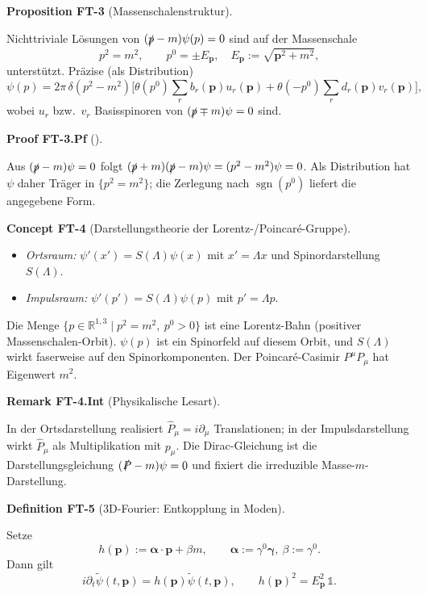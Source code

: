 \documentclass[10pt, letterpaper]{article}
\newcommand{\sgn}{\operatorname{sgn}}
\newcommand{\R}{\mathbb{R}}
\newcommand{\CustomHeading}[3]{%
  \par\medskip\noindent%
  \textbf{#1 #2} \textnormal{(#3)}.\enskip%
}
\newenvironment{DEF}[2]{\begin{unitbox}\CustomHeading{Definition}{#1}{#2}}{\end{unitbox}}
\newenvironment{PROP}[2]{\begin{unitbox}\CustomHeading{Proposition}{#1}{#2}}{\end{unitbox}}
\newenvironment{REM}[2]{\begin{unitbox}\CustomHeading{Remark}{#1}{#2}}{\end{unitbox}}
\newenvironment{CONC}[2]{\begin{unitbox}\CustomHeading{Concept}{#1}{#2}}{\end{unitbox}}
\newenvironment{PROOF}[2]{\begin{unitbox}\CustomHeading{Proof}{#1}{#2}}{\end{unitbox}}
\begin{document}
\begin{PROP}{FT-3}{Massenschalenstruktur}
Nichttriviale Lösungen von $(\slashed p - m)\psi(p)=0$ sind auf der Massenschale
\[
 p^2=m^2,\qquad p^0=\pm E_{\mathbf p},\quad E_{\mathbf p}:=\sqrt{\mathbf p^2+m^2},
\]
unterstützt. Präzise (als Distribution)
\[
 \psi(p)=2\pi\,\delta(p^2-m^2)\Big[\theta(p^0)\sum_{r}b_r(\mathbf p)u_r(\mathbf p)
 +\theta(-p^0)\sum_{r}d_r(\mathbf p)v_r(\mathbf p)\Big],
\]
wobei $u_r$ bzw.\ $v_r$ Basisspinoren von $(\slashed p\mp m)\psi=0$ sind.
\end{PROP}

\begin{PROOF}{FT-3.Pf}{}
Aus $(\slashed p-m)\psi=0$ folgt $(\slashed p+m)(\slashed p-m)\psi=(p^2-m^2)\psi=0$. Als Distribution hat $\psi$ daher Träger in $\{p^2=m^2\}$; die Zerlegung nach $\sgn(p^0)$ liefert die angegebene Form.
\end{PROOF}

\begin{CONC}{FT-4}{Darstellungstheorie der Lorentz-/Poincaré-Gruppe}
\begin{itemize}
\item \emph{Ortsraum:} $\psi'(x')=S(\Lambda)\psi(x)$ mit $x'=\Lambda x$ und Spinordarstellung $S(\Lambda)$.
\item \emph{Impulsraum:} $\psi'(p')=S(\Lambda)\psi(p)$ mit $p'=\Lambda p$.
\end{itemize}
Die Menge $\{p\in\R^{1,3}\mid p^2=m^2,\ p^0>0\}$ ist eine Lorentz-Bahn (positiver Massenschalen-Orbit). $\psi(p)$ ist ein Spinorfeld auf diesem Orbit, und $S(\Lambda)$ wirkt faserweise auf den Spinorkomponenten. Der Poincaré-Casimir $P^\mu P_\mu$ hat Eigenwert $m^2$.
\end{CONC}

\begin{REM}{FT-4.Int}{Physikalische Lesart}
In der Ortsdarstellung realisiert $\hat P_\mu=i\partial_\mu$ Translationen; in der Impulsdarstellung wirkt $\hat P_\mu$ als Multiplikation mit $p_\mu$. Die Dirac-Gleichung ist die Darstellungsgleichung $(\slashed P-m)\psi=0$ und fixiert die irreduzible Masse-$m$-Darstellung.
\end{REM}

\begin{DEF}{FT-5}{3D-Fourier: Entkopplung in Moden}
Setze
\[
 h(\mathbf p):=\boldsymbol{\alpha}\cdot\mathbf p+\beta m,\qquad 
 \boldsymbol{\alpha}:=\gamma^0\boldsymbol{\gamma},\ \beta:=\gamma^0.
\]
Dann gilt
\[
 i\partial_t\tilde\psi(t,\mathbf p)=h(\mathbf p)\tilde\psi(t,\mathbf p),\qquad
 h(\mathbf p)^2=E_{\mathbf p}^2\,\mathbb{1}.
\]
\end{DEF}
\end{document}
